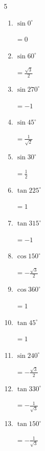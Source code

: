 \begin{multicols}{5}
\begin{enumerate}
        $\displaystyle =0$

  \item $\displaystyle \sin{0^\circ}$

        $\displaystyle =0$

  \item $\displaystyle \sin{60^\circ}$

        $\displaystyle =\frac{\sqrt{3}}{2}$

  \item $\displaystyle \sin{270^\circ}$

        $\displaystyle =-1$

  \item $\displaystyle \sin{45^\circ}$

        $\displaystyle =\frac{1}{\sqrt{2}}$

  \item $\displaystyle \sin{30^\circ}$

        $\displaystyle =\frac{1}{2}$

  \item $\displaystyle \tan{225^\circ}$

        $\displaystyle =1$

  \item $\displaystyle \tan{315^\circ}$

        $\displaystyle =-1$

  \item $\displaystyle \cos{150^\circ}$

        $\displaystyle =-\frac{\sqrt{3}}{2}$

  \item $\displaystyle \cos{360^\circ}$

        $\displaystyle =1$

  \item $\displaystyle \tan{45^\circ}$

        $\displaystyle =1$

  \item $\displaystyle \sin{240^\circ}$

        $\displaystyle =-\frac{\sqrt{3}}{2}$

  \item $\displaystyle \tan{330^\circ}$

        $\displaystyle =-\frac{1}{\sqrt{3}}$

  \item $\displaystyle \tan{150^\circ}$

        $\displaystyle =-\frac{1}{\sqrt{3}}$


\end{enumerate}
\end{multicols}
